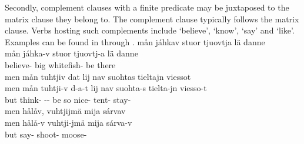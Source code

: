 Secondly, complement clauses with a finite predicate may be juxtaposed to the matrix clause they belong to. The complement clause typically follows the matrix clause. 
Verbs hosting such complements include  ‘believe’,  ‘know’,  ‘say’ and  ‘like’. %
Examples can be found in  through .%
\ea\label{complClauseJuxFin1}
\glll	mån jáhkav stuor tjuovtja lä danne\\
	mån jáhka-v stuor tjuovtj-a lä danne\\
	 believe- big whitefish- be\BS{} there\\\nopagebreak
{} 
\z
\ea\label{complClauseJuxFin2}%
\glll	men mån tuhtjiv dat lij nav suohtas tieltajn viessot\\
	men mån tuhtji-v d-a-t lij nav suohta-s tielta-jn viesso-t\\
	but  think- -- be\BS{} so nice- tent- stay-\\\nopagebreak
{} 
\z
\ea\label{complClauseJuxFin3}%
\glll	men hålåv, vuhtjijmä mija sárvav\\
	men hålå-v vuhtji-jmä mija sárva-v\\
	but say- shoot-  moose-\\\nopagebreak
{} 
\z

